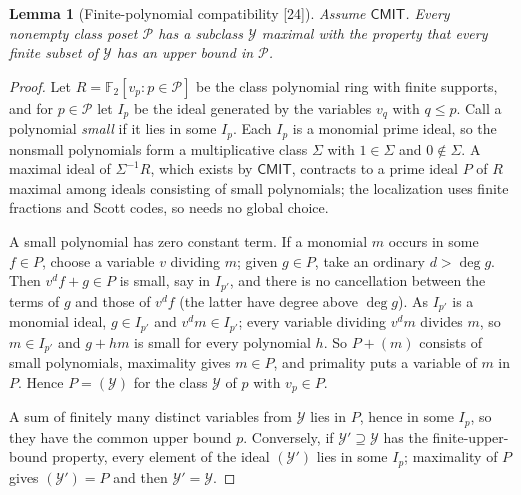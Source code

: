 \documentclass[11pt,letterpaper]{article}
\numberwithin{equation}{section}
\newtheorem{lemma}[lemma]{Lemma}
\theoremstyle{definition}
\theoremstyle{remark}
\theoremstyle{plain}
\newcommand{\F}{\mathbb F}
\newcommand{\src}[1]{\textup{\textsf{[#1]}}}
\begin{document}
\begin{lemma}[Finite-polynomial compatibility \src{24}]\label{osq:cr:lem:compat}
Assume $\mathsf{CMIT}$. Every nonempty class poset $\mathcal P$ has a subclass $\mathcal Y$ maximal with the property that every finite subset of
$\mathcal Y$ has an upper bound in $\mathcal P$.
\end{lemma}
\begin{proof}
Let $R=\F_2[v_p:p\in\mathcal P]$ be the class polynomial ring with finite supports, and for $p\in\mathcal P$ let $I_p$ be the ideal generated by the
variables $v_q$ with $q\le p$. Call a polynomial \emph{small} if it lies in some $I_p$. Each $I_p$ is a monomial prime ideal, so the nonsmall
polynomials form a multiplicative class $\Sigma$ with $1\in\Sigma$ and $0\notin\Sigma$. A maximal ideal of $\Sigma^{-1}R$, which exists by
$\mathsf{CMIT}$, contracts to a prime ideal $P$ of $R$ maximal among ideals consisting of small polynomials; the localization uses finite fractions and
Scott codes, so needs no global choice.

A small polynomial has zero constant term. If a monomial $m$ occurs in some $f\in P$, choose a variable $v$ dividing $m$; given $g\in P$, take an
ordinary $d>\deg g$. Then $v^df+g\in P$ is small, say in $I_{p'}$, and there is no cancellation between the terms of $g$ and those of $v^df$ (the latter
have degree above $\deg g$). As $I_{p'}$ is a monomial ideal, $g\in I_{p'}$ and $v^dm\in I_{p'}$; every variable dividing $v^dm$ divides $m$, so $m\in
I_{p'}$ and $g+hm$ is small for every polynomial $h$. So $P+(m)$ consists of small polynomials, maximality gives $m\in P$, and primality puts a
variable of $m$ in $P$. Hence $P=(\mathcal Y)$ for the class $\mathcal Y$ of $p$ with $v_p\in P$.

A sum of finitely many distinct variables from $\mathcal Y$ lies in $P$, hence in some $I_p$, so they have the common upper bound $p$. Conversely, if
$\mathcal Y'\supseteq\mathcal Y$ has the finite-upper-bound property, every element of the ideal $(\mathcal Y')$ lies in some $I_p$; maximality of $P$
gives $(\mathcal Y')=P$ and then $\mathcal Y'=\mathcal Y$.
\end{proof}
\end{document}
